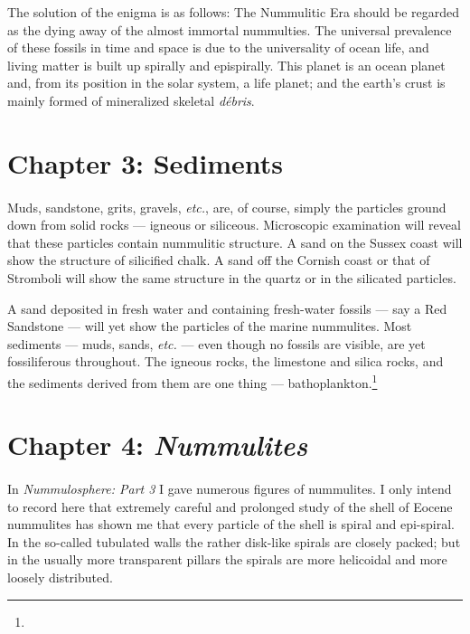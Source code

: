 \documentclass[a4paper, 12pt, oneside]{article}
\begin{document}
The solution of the enigma is as follows: The Nummulitic Era should be regarded as the dying away of the almost immortal nummulties. The universal prevalence of these fossils in time and space is due to the universality of ocean life, and living matter is built up spirally and epispirally. This planet is an ocean planet and, from its position in the solar system, a life planet; and the earth's crust is mainly formed of mineralized skeletal \emph{débris}.
\clearpage
\section{Chapter 3: Sediments}
\paragraph{}
Muds, sandstone, grits, gravels, \emph{etc.}, are, of course, simply the particles ground down from solid rocks --- igneous or siliceous. Microscopic examination will reveal that these particles contain nummulitic structure. A sand on the Sussex coast will show the structure of silicified chalk. A sand off the Cornish coast or that of Stromboli will show the same structure in the quartz or in the silicated particles.

A sand deposited in fresh water and containing fresh-water fossils --- say a Red Sandstone --- will yet show the particles of the marine nummulites. Most sediments --- muds, sands, \emph{etc.} --- even though no fossils are visible, are yet fossiliferous throughout. The igneous rocks, the limestone and silica rocks, and the sediments derived from them are one thing --- bathoplankton.\footnote{}
\clearpage
\section{Chapter 4: \emph{Nummulites}}
\paragraph{}
In \emph{Nummulosphere: Part 3} I gave numerous figures of nummulites. I only intend to record here that extremely careful and prolonged study of the shell of Eocene nummulites has shown me that every particle of the shell is spiral and epi-spiral. In the so-called tubulated walls the rather disk-like spirals are closely packed; but in the usually more transparent pillars the spirals are more helicoidal and more loosely distributed.
\end{document}
